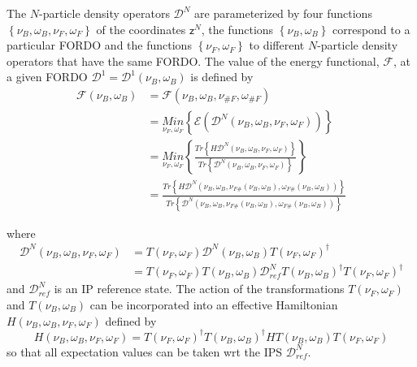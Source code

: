 \documentclass[aps,preprint]{revtex4}%
\begin{document}
The $N$-particle density operators $\mathcal{D}^{N}$ are parameterized by four
functions $\left\{  \nu_{B},\omega_{B},\nu_{F},\omega_{F}\right\}  $ of the
coordinates $\mathsf{z}^{N}$, the functions $\left\{  \nu_{B},\omega
_{B}\right\}  $ correspond to a particular FORDO and the functions $\left\{
\nu_{F},\omega_{F}\right\}  $ to different $N$-particle density operators that
have the same FORDO. The value of the energy functional, $\mathcal{F}$, at a
given FORDO $\mathcal{D}^{1}=\mathcal{D}^{1}\left(  \nu_{B},\omega_{B}\right)
$ is defined by
\begin{align}
\mathcal{F}\left(  \nu_{B},\omega_{B}\right)   &  =\mathcal{F}\left(  \nu
_{B},\omega_{B},\nu_{\#F},\omega_{\#F}\right) \nonumber\\
&  =\underset{\nu_{F},\omega_{F}}{Min}\left\{  \mathcal{E}\left(
\mathcal{D}^{N}\left(  \nu_{B},\omega_{B},\nu_{F},\omega_{F}\right)  \right)
\right\} \nonumber\\
&  =\underset{\nu_{F},\omega_{F}}{Min}\left\{  \frac{Tr\left\{  H\mathcal{D}%
^{N}\left(  \nu_{B},\omega_{B},\nu_{F},\omega_{F}\right)  \right\}
}{Tr\left\{  \mathcal{D}^{N}\left(  \nu_{B},\omega_{B},\nu_{F},\omega
_{F}\right)  \right\}  }\right\} \nonumber\\
&  =\frac{Tr\left\{  H\mathcal{D}^{N}\left(  \nu_{B},\omega_{B},\nu
_{F\#}\left(  \nu_{B},\omega_{B}\right)  ,\omega_{F\#}\left(  \nu_{B}%
,\omega_{B}\right)  \right)  \right\}  }{Tr\left\{  \mathcal{D}^{N}\left(
\nu_{B},\omega_{B},\nu_{F\#}\left(  \nu_{B},\omega_{B}\right)  ,\omega
_{F\#}\left(  \nu_{B},\omega_{B}\right)  \right)  \right\}  }%
\end{align}


where
\begin{align}
\mathcal{D}^{N}\left(  \nu_{B},\omega_{B},\nu_{F},\omega_{F}\right)   &
=T\left(  \nu_{F},\omega_{F}\right)  \mathcal{D}^{N}\left(  \nu_{B},\omega
_{B}\right)  T\left(  \nu_{F},\omega_{F}\right)  ^{\dagger}\nonumber\\
&  =T\left(  \nu_{F},\omega_{F}\right)  T\left(  \nu_{B},\omega_{B}\right)
\mathcal{D}_{ref}^{N}T\left(  \nu_{B},\omega_{B}\right)  ^{\dagger}T\left(
\nu_{F},\omega_{F}\right)  ^{\dagger}%
\end{align}
and $\mathcal{D}_{ref}^{N}$ is an IP reference state. The action of the
transformations $T\left(  \nu_{F},\omega_{F}\right)  $ and $T\left(  \nu
_{B},\omega_{B}\right)  $ can be incorporated into an effective Hamiltonian
$H\left(  \nu_{B},\omega_{B},\nu_{F},\omega_{F}\right)  $ defined by
\begin{equation}
H\left(  \nu_{B},\omega_{B},\nu_{F},\omega_{F}\right)  =T\left(  \nu
_{F},\omega_{F}\right)  ^{\dagger}T\left(  \nu_{B},\omega_{B}\right)
^{\dagger}HT\left(  \nu_{B},\omega_{B}\right)  T\left(  \nu_{F},\omega
_{F}\right)
\end{equation}
so that all expectation values can be taken wrt the IPS $\mathcal{D}_{ref}%
^{N}$.
\end{document}
